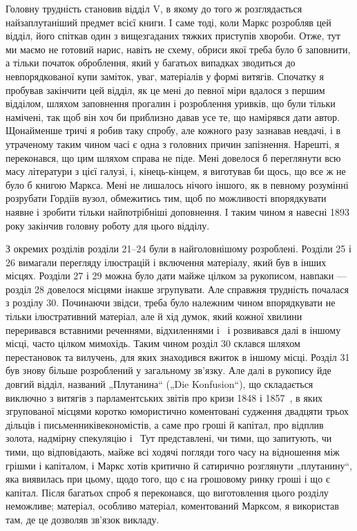 
Головну трудність становив відділ V, в якому до того ж
розглядається найзаплутаніший предмет всієї книги. І саме тоді,
коли Маркс розробляв цей відділ, його спіткав один з вищезгаданих
тяжких приступів хвороби. Отже, тут ми маємо не готовий
нарис, навіть не схему, обриси якої треба було б заповнити,
а тільки початок оброблення, який у багатьох випадках зводиться
до невпорядкованої купи заміток, уваг, матеріалів у формі
витягів. Спочатку я пробував закінчити цей відділ, як це мені
до певної міри вдалося з першим відділом, шляхом заповнення
прогалин і розроблення уривків, що були тільки намічені, так щоб
він хоч би приблизно давав усе те, що намірявся дати автор. Щонайменше
тричі я робив таку спробу, але кожного разу зазнавав
невдачі, і в утраченому таким чином часі є одна з головних причин
запізнення. Нарешті, я переконався, що цим шляхом справа
не піде. Мені довелося б переглянути всю масу літератури з цієї
галузі, і, кінець-кінцем, я виготував би щось, що все ж не було б
книгою Маркса. Мені не лишалось нічого іншого, як в певному
розумінні розрубати Гордіїв вузол, обмежитись тим, щоб по
можливості впорядкувати наявне і зробити тільки найпотрібніші
доповнення. І таким чином я навесні 1893 року закінчив головну
роботу для цього відділу.

З окремих розділів розділи 21--24 були в найголовнішому
розроблені. Розділи 25 і 26 вимагали перегляду ілюстрацій і
включення матеріалу, який був в інших місцях. Розділи 27 і 29 можна
було дати майже цілком за рукописом, навпаки — розділ 28 довелося
місцями інакше згрупувати. Але справжня трудність почалася
з розділу 30. Починаючи звідси, треба було належним чином
впорядкувати не тільки ілюстративний матеріал, але й хід думок,
який кожної хвилини переривався вставними реченнями, відхиленнями
і~ і розвивався далі в іншому місці, часто цілком мимохідь.
Таким чином розділ 30 склався шляхом перестановок та вилучень,
для яких знаходився вжиток в іншому місці. Розділ 31 був знову
більше розроблений у загальному зв’язку. Але далі в рукопису
йде довгий відділ, названий „Плутанина“ („Die Konfusion“), що
складається виключно з витягів з парламентських звітів про кризи
1848 і 1857~, в яких згрупованої місцями коротко юмористично
коментовані судження двадцяти трьох дільців і письменниківекономістів,
а саме про гроші й капітал, про відплив золота, надмірну
спекуляцію і~ Тут представлені, чи тими, що запитують,
чи тими, що відповідають, майже всі ходячі погляди того
часу на відношення між грішми і капіталом, і Маркс хотів критично
й сатирично розглянути „плутанину“, яка виявилась при цьому,
щодо того, що є на грошовому ринку гроші і що є капітал.
Після багатьох спроб я переконався, що виготовлення цього
розділу неможливе; матеріал, особливо матеріал, коментований
Марксом, я використав там, де це дозволяв зв’язок викладу.

